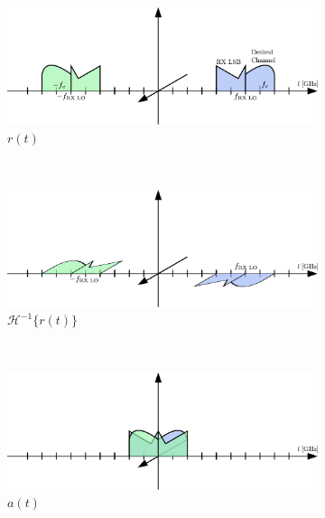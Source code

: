 \begin{figure}[h!]
  \centering
  \begin{subfigure}{0.45\textwidth}
    \centering
    \includegraphics[width=\textwidth]{figures/rx_rf_1_freq_s}
    \caption{$r(t)$}
    \label{fig:rx_rf_1_freq_s}
  \end{subfigure}
  ~
  \begin{subfigure}{0.45\textwidth}
    \centering
    \includegraphics[width=\textwidth]{figures/rx_rf_1_freq_Hs}
    \caption{$\mathcal{H}^{-1}\{r(t)\}$}
    \label{fig:rx_rf_1_freq_Hs}
  \end{subfigure}
  \vspace{4ex} \\
  \begin{subfigure}{0.45\textwidth}
    \centering
    \includegraphics[width=\textwidth]{figures/rx_rf_1_freq_a}
    \caption{$a(t)$}
    \label{fig:rx_rf_1_freq_a}
  \end{subfigure}
  ~
  \begin{subfigure}{0.45\textwidth}
    \centering

\end{subfigure}
\end{figure}
